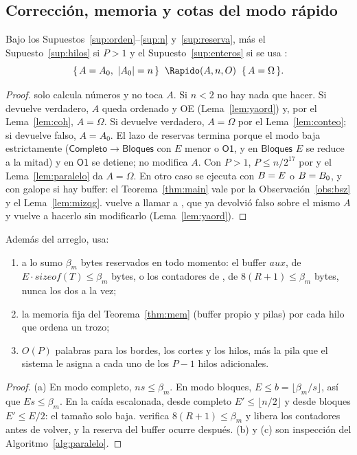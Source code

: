 \subsection{Corrección, memoria y cotas del modo rápido}

\begin{teorema}\label{thm:rapido}
Bajo los Supuestos~\ref{sup:orden}--\ref{sup:n} y~\ref{sup:reserva}, más el
Supuesto~\ref{sup:hilos} si $P>1$ y el Supuesto~\ref{sup:enteros} si se usa \Conteo:
\[
\hoare{A=A_0,\ |A_0|=n}{\Rapido(A,n,O)}{A=\Omega}.
\]
\end{teorema}
\begin{proof}
\PlanF solo calcula números y no toca $A$. Si $n<2$ no hay nada que hacer. Si \Ordenado
devuelve verdadero, $A$ queda ordenado y OE (Lema~\ref{lem:yaord}) y, por el
Lema~\ref{lem:coh}, $A=\Omega$. Si \Conteo devuelve verdadero, $A=\Omega$ por el
Lema~\ref{lem:conteo}; si devuelve falso, $A=A_0$. El lazo de reservas termina porque
el modo baja estrictamente ($\mathsf{Completo}\to\mathsf{Bloques}$ con $E$ menor o
$\mathsf{O1}$, y en $\mathsf{Bloques}$ $E$ se reduce a la mitad) y en $\mathsf{O1}$ se
detiene; no modifica $A$. Con $P>1$, $P\le n/2^{17}$ por \PlanF y el
Lema~\ref{lem:paralelo} da $A=\Omega$. En otro caso se ejecuta \SotSort con $B=E$ o
$B=B_0$, y con galope si hay buffer: el Teorema~\ref{thm:main} vale por la
Observación~\ref{obs:bsz} y el Lema~\ref{lem:mizqg}. \SotSort vuelve a llamar a
\Ordenado, que ya devolvió falso sobre el mismo $A$ y vuelve a hacerlo sin modificarlo
(Lema~\ref{lem:yaord}).
\end{proof}

\begin{teorema}\label{thm:rapmem}
Además del arreglo, \Rapido usa:
\begin{enumerate}[label=(\alph*),nosep]
\item a lo sumo $\beta_m$ bytes reservados en todo momento: el buffer
  $\mathit{aux}$, de $E\cdot\mathit{sizeof}(T)\le\beta_m$ bytes, o los contadores de
  \Conteo, de $8(R+1)\le\beta_m$ bytes, nunca los dos a la vez;
\item la memoria fija del Teorema~\ref{thm:mem} (buffer propio y pilas) por cada hilo
  que ordena un trozo;
\item $O(P)$ palabras para los bordes, los cortes y los hilos, más la pila que el
  sistema le asigna a cada uno de los $P-1$ hilos adicionales.
\end{enumerate}
\end{teorema}
\begin{proof}
(a) En modo completo, $ns\le\beta_m$. En modo bloques, $E\le b=\lfloor\beta_m/s\rfloor$,
así que $Es\le\beta_m$. En la caída escalonada, desde completo
$E'\le\lfloor n/2\rfloor$ y desde bloques $E'\le E/2$: el tamaño solo baja. \Conteo
verifica $8(R+1)\le\beta_m$ y libera los contadores antes de volver, y la reserva del
buffer ocurre después. (b) y (c) son inspección del Algoritmo~\ref{alg:paralelo}.
\end{proof}

